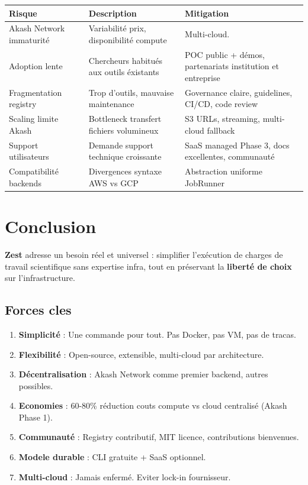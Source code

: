 \documentclass[11pt,a4paper]{article}
\newcommand{\highlight}[1]{\textbf{\color{darkblue}#1}}
\begin{document}
	\begin{table}[H]
		\centering
		\small
		\begin{tabularx}{\linewidth}{l | p{5.5cm} | p{4cm}}
			\toprule
			\textbf{Risque} & \textbf{Description} & \textbf{Mitigation} \\
			\midrule
			Akash Network immaturité & Variabilité prix, disponibilité compute & Multi-cloud. \\
			Adoption lente & Chercheurs habitués aux outils éxistants & POC public + démos, partenariats institution et entreprise \\
			Fragmentation registry & Trop d'outils, mauvaise maintenance & Governance claire, guidelines, CI/CD, code review \\
			Scaling limite Akash & Bottleneck transfert fichiers volumineux & S3 URLs, streaming, multi-cloud fallback \\
			Support utilisateurs & Demande support technique croissante & SaaS managed Phase 3, docs excellentes, communauté \\
			Compatibilité backends & Divergences syntaxe AWS vs GCP & Abstraction uniforme JobRunner \\
			\bottomrule
		\end{tabularx}
	\end{table}
	
	\newpage
	
	\section{Conclusion}
	
	\highlight{Zest} adresse un besoin réel et universel : simplifier l'exécution de charges de travail scientifique sans expertise infra, tout en préservant la \textbf{liberté de choix} sur l'infrastructure.
	
	\subsection{Forces cles}
	
	\begin{enumerate}
		\item \textbf{Simplicité} : Une commande pour tout. Pas Docker, pas VM, pas de tracas.
		\item \textbf{Flexibilité} : Open-source, extensible, multi-cloud par architecture.
		\item \textbf{Décentralisation} : Akash Network comme premier backend, autres possibles.
		\item \textbf{Economies} : 60-80\% réduction couts compute vs cloud centralisé (Akash Phase 1).
		\item \textbf{Communauté} : Registry contributif, MIT licence, contributions bienvenues.
		\item \textbf{Modele durable} : CLI gratuite + SaaS optionnel.
		\item \textbf{Multi-cloud} : Jamais enfermé. Eviter lock-in fournisseur.
	\end{enumerate}
	
\end{document}
